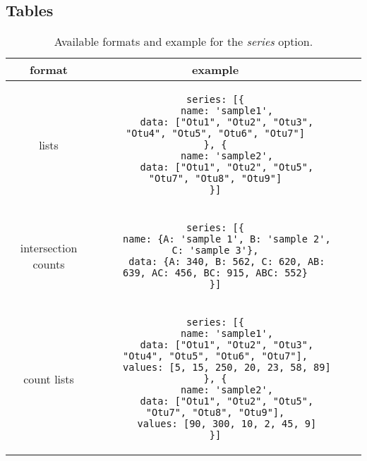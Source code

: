 \documentclass{bmcart}
\begin{document}
\begin{backmatter}
\section*{Tables}
\begin{table}[h!]
\caption{Available formats and example for the \textit{series} option.}
      \begin{tabular}{cccc}
        \hline
        format & example\\ \hline
        lists & 
\begin{lstlisting}
series: [{
	name: 'sample1',
	data: ["Otu1", "Otu2", "Otu3", "Otu4", "Otu5", "Otu6", "Otu7"]
}, {
	name: 'sample2',
	data: ["Otu1", "Otu2", "Otu5", "Otu7", "Otu8", "Otu9"]
}]
\end{lstlisting}\\ \hline
        intersection counts & 
\begin{lstlisting}
series: [{
	name: {A: 'sample 1', B: 'sample 2', C: 'sample 3'},
	data: {A: 340, B: 562, C: 620, AB: 639, AC: 456, BC: 915, ABC: 552}
}]
\end{lstlisting}\\ \hline
        count lists  &
\begin{lstlisting}
series: [{
	name: 'sample1',
	data: ["Otu1", "Otu2", "Otu3", "Otu4", "Otu5", "Otu6", "Otu7"],
	values: [5, 15, 250, 20, 23, 58, 89]
}, {
	name: 'sample2',
	data: ["Otu1", "Otu2", "Otu5", "Otu7", "Otu8", "Otu9"],
	values: [90, 300, 10, 2, 45, 9]
}]
\end{lstlisting}\\ \hline
      \end{tabular}
\end{table}

\end{backmatter}
\end{document}

